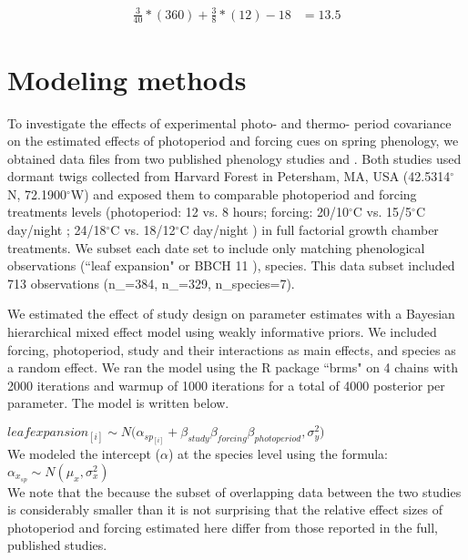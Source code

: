 \documentclass[11pt]{article}
\begin{document}
\begin{align}
\frac{3}{40}*(360) + \frac{3}{8}*(12)-18 &=13.5
\end{align}


\section*{Modeling methods}
To investigate the effects of experimental photo- and thermo- period covariance on the estimated effects of photoperiod and forcing cues on spring phenology,  we obtained data files from two published phenology studies \cite{Flynn2018} and \cite{Buonaiuto:2021ug}. Both studies used dormant twigs collected from Harvard Forest in Petersham, MA, USA (42.5314$^{\circ}$N, 72.1900$^{\circ}$W)  and exposed them to comparable photoperiod and forcing treatments levels (photoperiod: 12 vs. 8 hours; forcing: 20/10$^{\circ}$C vs. 15/5$^{\circ}$C day/night \citep{Flynn2018}; 24/18$^{\circ}$C vs. 18/12$^{\circ}$C day/night \citep{Buonaiuto:2021ug}) in full factorial growth chamber treatments. We subset each date set to include only matching phenological observations (``leaf expansion" or BBCH 11 \citep{Finn2007}), species. This data subset included 713 observations (n_{\cite{Flynn2018}}=384, n_{\cite{Buonaiuto:2021ug}}=329, n_{species}=7).

We estimated the effect of study design on parameter estimates with a Bayesian hierarchical mixed effect model using weakly informative priors. %
We included forcing, photoperiod, study and their interactions as main effects, and species as a random effect. We ran the model using the R package ``brms" \citep{Burkner2018} on 4 chains with 2000 iterations and warmup of 1000 iterations for a total of 4000 posterior per parameter. The model is written below.

$leafexpansion_{[i]} \sim N(\alpha_{sp_{[i]}}+\beta_{study} $\times$ \beta_{forcing} $\times$ \beta_{photoperiod}, \sigma_y^2)$\\

 We modeled the intercept ($\alpha$) at the species level using the formula:\\

$\alpha_{x_{sp}} \sim N(\mu_x,\sigma^2_x)$\\

We note that the because the subset of overlapping data between the two studies is considerably smaller than it is not surprising that the relative effect sizes of photoperiod and forcing estimated here differ from those reported in the full, published studies.
\end{document}
